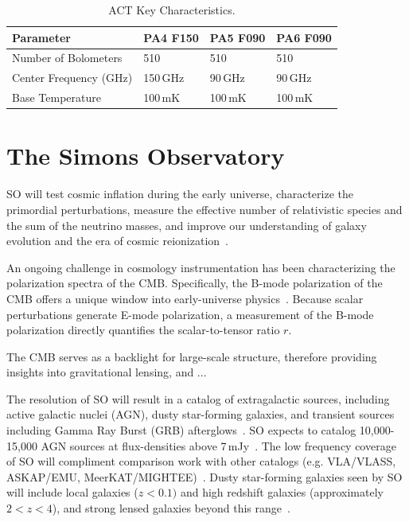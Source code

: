 \begin{table}[t]
    \centering
    \begin{tabular}{|l|l|l|l|} \hline
        \textbf{ Parameter} &  \textbf{PA4 F150} &  \textbf{PA5 F090}  &  \textbf{PA6 F090}  \\ \hline \hline
        Number of Bolometers & 510 & 510 & 510\\\hline
        Center Frequency (GHz) & 150\,GHz & 90\,GHz & 90\,GHz\\\hline
        Base Temperature & 100\,mK & 100\,mK & 100\,mK\\\hline
    \end{tabular} \caption{ACT Key Characteristics.}
    \label{tab:act}
\end{table}

\section{The Simons Observatory}

SO will test cosmic inflation during the early universe, characterize the primordial perturbations, measure the effective number of relativistic species and the sum of the neutrino masses, and improve our understanding of galaxy evolution and the era of cosmic reionization~\citep{so19,so_science}. 

An ongoing challenge in cosmology instrumentation has been characterizing the polarization spectra of the CMB.  Specifically, the B-mode polarization of the CMB offers a unique window into early-universe physics~\cite{}.  Because scalar perturbations generate E-mode polarization, a measurement of the B-mode polarization directly quantifies the scalar-to-tensor ratio $r$.

The CMB serves as a backlight for large-scale structure, therefore providing insights into gravitational lensing, and ...

The resolution of SO will result in a catalog of extragalactic sources, including active galactic nuclei (AGN), dusty star-forming galaxies, and transient sources including Gamma Ray Burst (GRB) afterglows~\cite{so_science}.  SO expects to catalog 10,000-15,000 AGN sources at flux-densities above 7\,mJy~\cite{Tucci_2011}.  The low frequency coverage of SO will compliment comparison work with other catalogs (e.g. VLA/VLASS, ASKAP/EMU, MeerKAT/MIGHTEE)~\cite{so_science}.  Dusty star-forming galaxies seen by SO will include local galaxies ($z<0.1)$ and high redshift galaxies (approximately $2<z<4$), and strong lensed galaxies beyond this range~\cite{Marrone_2017}.

